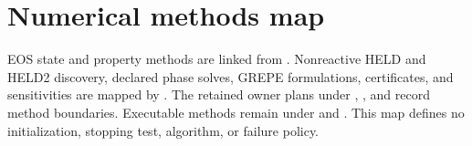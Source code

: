 \documentclass{article}
\begin{document}
\section{Numerical methods map}
EOS state and property methods are linked from
. Nonreactive HELD and HELD2 discovery,
declared phase solves, GREPE formulations, certificates, and sensitivities are
mapped by . The retained owner
plans under , , and
 record method boundaries. Executable methods
remain under  and . This map defines
no initialization, stopping test, algorithm, or failure policy.
\end{document}
